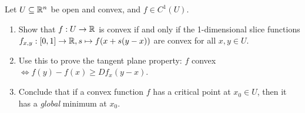 \hrulefill

\begin{exercise*}
Let $U \subseteq \mathbb{R}^n$ be open and convex, and $f \in C^1(U)$.
\begin{enumerate}
    \item Show that $f: U \to \mathbb{R}$ is convex if and only if the 1-dimensional slice functions $f_{x,y}: [0,1] \to \mathbb{R}, s \mapsto f(x + s(y-x))$ are convex for all $x, y \in U$.
    \item Use this to prove the tangent plane property: $f$ convex $\iff f(y) - f(x) \ge Df_x(y-x)$.
    \item Conclude that if a convex function $f$ has a critical point at $x_0 \in U$, then it has a \emph{global} minimum at $x_0$.
\end{enumerate}
\end{exercise*}

